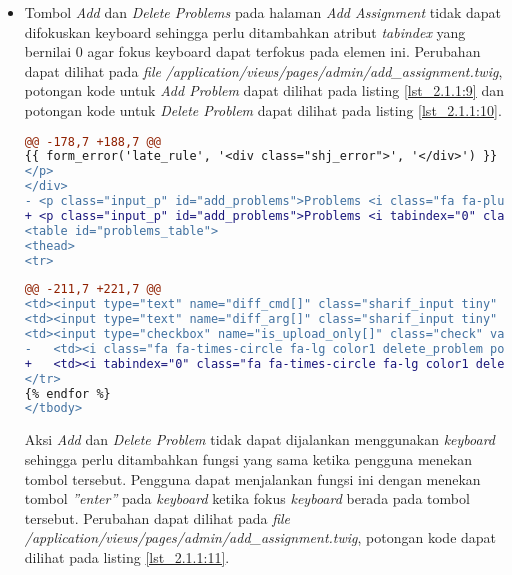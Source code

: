 \begin{itemize}
	\item Tombol \textit{Add} dan \textit{Delete Problems} pada halaman \textit{Add Assignment} tidak dapat difokuskan keyboard sehingga perlu ditambahkan atribut \textit{tabindex} yang bernilai 0 agar fokus keyboard dapat terfokus pada elemen ini. Perubahan dapat dilihat pada \textit{file} \textit{/application/views/pages/admin/add\_assignment.twig}, potongan kode untuk \textit{Add Problem} dapat dilihat pada listing \ref{lst_2.1.1:9} dan potongan kode untuk \textit{Delete Problem} dapat dilihat pada listing \ref{lst_2.1.1:10}.
	
\begin{lstlisting}[language=diff, caption=Perubahan untuk \textit{Add Problem} pada \textit{file} \textit{add\_assignment.twig}, label=lst_2.1.1:9, basicstyle=\ttfamily, frame=single,
columns=fullflexible, keepspaces=true, breaklines=true]
@@ -178,7 +188,7 @@
{{ form_error('late_rule', '<div class="shj_error">', '</div>') }}
</p>
</div>
- <p class="input_p" id="add_problems">Problems <i class="fa fa-plus-circle fa-lg color11 pointer" id="add"></i>
+ <p class="input_p" id="add_problems">Problems <i tabindex="0" class="fa fa-plus-circle fa-lg color11 pointer" id="add"></i>
<table id="problems_table">
<thead>
<tr>
\end{lstlisting}

\begin{lstlisting}[language=diff, caption=Perubahan untuk \textit{Delete Problem} pada \textit{file} \textit{add\_assignment.twig}, label=lst_2.1.1:10, basicstyle=\ttfamily, frame=single,
columns=fullflexible, keepspaces=true, breaklines=true]
@@ -211,7 +221,7 @@
<td><input type="text" name="diff_cmd[]" class="sharif_input tiny" value="{{ problem.diff_cmd }}"/></td>
<td><input type="text" name="diff_arg[]" class="sharif_input tiny" value="{{ problem.diff_arg }}"/></td>
<td><input type="checkbox" name="is_upload_only[]" class="check" value="{{ problem.id }}" {{ problem.is_upload_only ? 'checked' }}/></td>
- 	<td><i class="fa fa-times-circle fa-lg color1 delete_problem pointer"></i></td>
+ 	<td><i tabindex="0" class="fa fa-times-circle fa-lg color1 delete_problem pointer"></i></td>
</tr>
{% endfor %}
</tbody>
\end{lstlisting}

	Aksi \textit{Add} dan \textit{Delete Problem} tidak dapat dijalankan menggunakan \textit{keyboard} sehingga perlu ditambahkan fungsi yang sama ketika pengguna menekan tombol tersebut. Pengguna dapat menjalankan fungsi ini dengan menekan tombol \textit{''enter''} pada \textit{keyboard} ketika fokus \textit{keyboard} berada pada tombol tersebut. Perubahan dapat dilihat pada \textit{file} \textit{/application/views/pages/admin/add\_assignment.twig}, potongan kode dapat dilihat pada listing \ref{lst_2.1.1:11}.
	

\end{itemize}
